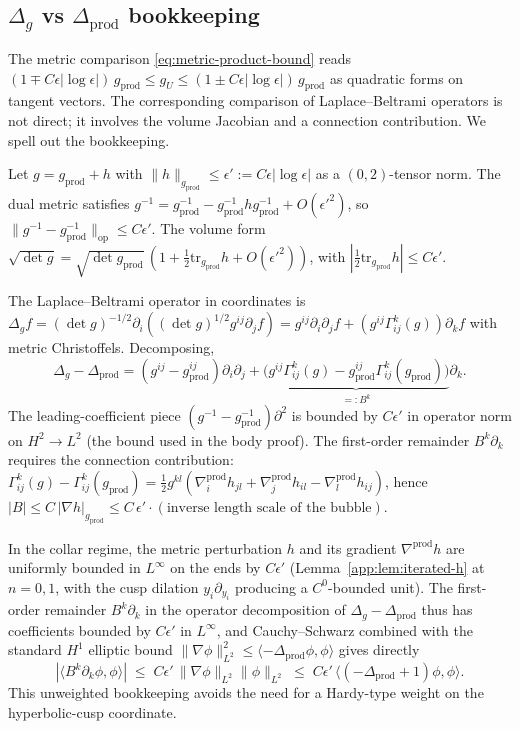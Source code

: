 \documentclass[11pt,letterpaper]{article}
\theoremstyle{definition}
\newcommand{\Lap}{\Delta}
\begin{document}
\subsection{$\Lap_g$ vs $\Lap_{\mathrm{prod}}$ bookkeeping}\label{app:sec:laplacian}

The metric comparison \eqref{eq:metric-product-bound} reads $(1\mp C\epsilon|\log\epsilon|)\,g_{\mathrm{prod}} \le g_U \le (1\pm C\epsilon|\log\epsilon|)\,g_{\mathrm{prod}}$ as quadratic forms on tangent vectors. The corresponding comparison of Laplace--Beltrami operators is not direct; it involves the volume Jacobian and a connection contribution. We spell out the bookkeeping.

Let $g = g_{\mathrm{prod}} + h$ with $\|h\|_{g_{\mathrm{prod}}} \le \epsilon' := C\epsilon|\log\epsilon|$ as a $(0,2)$-tensor norm. The dual metric satisfies $g^{-1} = g_{\mathrm{prod}}^{-1} - g_{\mathrm{prod}}^{-1} h g_{\mathrm{prod}}^{-1} + O({\epsilon'}^2)$, so $\|g^{-1} - g_{\mathrm{prod}}^{-1}\|_{\mathrm{op}} \le C\epsilon'$. The volume form $\sqrt{\det g} = \sqrt{\det g_{\mathrm{prod}}}\,(1 + \tfrac12 \mathrm{tr}_{g_{\mathrm{prod}}}h + O({\epsilon'}^2))$, with $|\tfrac12\mathrm{tr}_{g_{\mathrm{prod}}}h| \le C \epsilon'$.

The Laplace--Beltrami operator in coordinates is $\Lap_g f = (\det g)^{-1/2}\partial_i((\det g)^{1/2}g^{ij}\partial_j f) = g^{ij}\partial_i\partial_j f + (g^{ij}\Gamma_{ij}^k(g))\partial_k f$ with metric Christoffels. Decomposing,
\[
\Lap_g - \Lap_{\mathrm{prod}} = (g^{ij} - g_{\mathrm{prod}}^{ij})\partial_i\partial_j + \underbrace{\bigl(g^{ij}\Gamma^k_{ij}(g) - g_{\mathrm{prod}}^{ij}\Gamma^k_{ij}(g_{\mathrm{prod}})\bigr)}_{=: B^k}\partial_k.
\]
The leading-coefficient piece $(g^{-1} - g_{\mathrm{prod}}^{-1})\partial^2$ is bounded by $C\epsilon'$ in operator norm on $H^2 \to L^2$ (the bound used in the body proof). The first-order remainder $B^k\partial_k$ requires the connection contribution: $\Gamma^k_{ij}(g) - \Gamma^k_{ij}(g_{\mathrm{prod}}) = \tfrac12 g^{kl}(\nabla^{\mathrm{prod}}_i h_{jl} + \nabla^{\mathrm{prod}}_j h_{il} - \nabla^{\mathrm{prod}}_l h_{ij})$, hence $|B| \le C\,|\nabla h|_{g_{\mathrm{prod}}} \le C\,\epsilon'\cdot (\text{inverse length scale of the bubble})$.

In the collar regime, the metric perturbation $h$ and its gradient $\nabla^{\mathrm{prod}} h$ are uniformly bounded in $L^\infty$ on the ends by $C\epsilon'$ (Lemma~\ref{app:lem:iterated-h} at $n=0, 1$, with the cusp dilation $y_i\partial_{y_i}$ producing a $C^0$-bounded unit). The first-order remainder $B^k\partial_k$ in the operator decomposition of $\Lap_g - \Lap_{\mathrm{prod}}$ thus has coefficients bounded by $C\epsilon'$ in $L^\infty$, and Cauchy--Schwarz combined with the standard $H^1$ elliptic bound $\|\nabla\phi\|_{L^2}^2 \le \langle -\Lap_{\mathrm{prod}}\phi,\phi\rangle$ gives directly
\[
|\langle B^k\partial_k\phi,\phi\rangle| \;\le\; C\epsilon'\,\|\nabla\phi\|_{L^2}\|\phi\|_{L^2} \;\le\; C\epsilon'\,\langle (-\Lap_{\mathrm{prod}}+1)\phi,\phi\rangle.
\]
This unweighted bookkeeping avoids the need for a Hardy-type weight on the hyperbolic-cusp coordinate.
\end{document}
